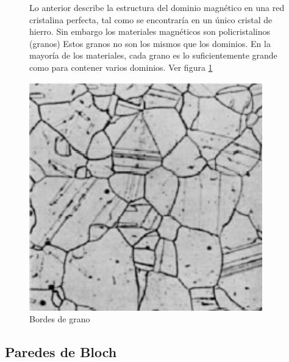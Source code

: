 \begin{figure}[H]
\begin{minipage}[b]{0.5\linewidth}
	\vspace{0pt}\raggedright
	Lo anterior describe la estructura del dominio magnético en una red cristalina perfecta, tal como se encontraría en un único cristal de hierro. Sin embargo los materiales magnéticos son policristalinos (granos) Estos granos no son los mismos que los dominios. En la mayoría de los materiales, cada grano es lo suficientemente grande como para contener varios dominios. Ver figura \ref{fig:dominioGrano2}

\vspace{1.2cm}

\end{minipage}
\begin{minipage}[b]{0.5\linewidth}
	\raggedleft
    \includegraphics[width=0.90\textwidth]{./Figures/dominio_grano2}
    \caption{Bordes de grano}
    \label{fig:dominioGrano2}
\end{minipage}
\end{figure}


\subsection{Paredes de Bloch}

